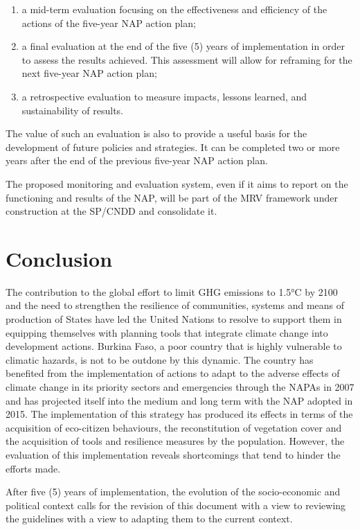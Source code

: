 \documentclass[
]{book}
\begin{document}
\begin{enumerate}
\def\labelenumi{\arabic{enumi})}
\item
  a mid-term evaluation focusing on the effectiveness and efficiency of the actions of the five-year NAP action plan;
\item
  a final evaluation at the end of the five (5) years of implementation in order to assess the results achieved. This assessment will allow for reframing for the next five-year NAP action plan;
\item
  a retrospective evaluation to measure impacts, lessons learned, and sustainability of results.
\end{enumerate}

The value of such an evaluation is also to provide a useful basis for the development of future policies and strategies. It can be completed two or more years after the end of the previous five-year NAP action plan.

The proposed monitoring and evaluation system, even if it aims to report on the functioning and results of the NAP, will be part of the MRV framework under construction at the SP/CNDD and consolidate it.

\chapter{Conclusion}\label{conclusion}

The contribution to the global effort to limit GHG emissions to 1.5°C by 2100 and the need to strengthen the resilience of communities, systems and means of production of States have led the United Nations to resolve to support them in equipping themselves with planning tools that integrate climate change into development actions. Burkina Faso, a poor country that is highly vulnerable to climatic hazards, is not to be outdone by this dynamic. The country has benefited from the implementation of actions to adapt to the adverse effects of climate change in its priority sectors and emergencies through the NAPAs in 2007 and has projected itself into the medium and long term with the NAP adopted in 2015. The implementation of this strategy has produced its effects in terms of the acquisition of eco-citizen behaviours, the reconstitution of vegetation cover and the acquisition of tools and resilience measures by the population. However, the evaluation of this implementation reveals shortcomings that tend to hinder the efforts made.

After five (5) years of implementation, the evolution of the socio-economic and political context calls for the revision of this document with a view to reviewing the guidelines with a view to adapting them to the current context.
\end{document}
